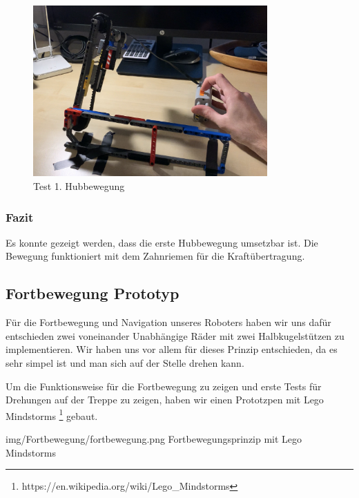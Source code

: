 \begin{figure}[H]
  \includegraphics[width=0.8\textwidth]{img/Test 1. Hub.png}
  \centering
  \caption{Test 1. Hubbewegung}
\end{figure}

\subsubsection{Fazit}

Es konnte gezeigt werden, dass die erste Hubbewegung umsetzbar ist. Die Bewegung funktioniert mit dem Zahnriemen für die Kraftübertragung.

\subsection{Fortbewegung Prototyp}

Für die Fortbewegung und Navigation unseres Roboters haben wir uns dafür entschieden zwei
voneinander Unabhängige Räder mit zwei Halbkugelstützen zu implementieren. 
Wir haben uns vor allem für dieses Prinzip entschieden, da es sehr simpel ist und man 
sich auf der Stelle drehen kann. 

Um die Funktionsweise für die Fortbewegung zu zeigen und erste Tests für Drehungen auf
der Treppe zu zeigen, haben wir einen Prototzpen mit Lego Mindstorms \footnote{https://en.wikipedia.org/wiki/Lego_Mindstorms}
gebaut.

\image
  {img/Fortbewegung/fortbewegung.png}
  {Fortbewegungsprinzip mit Lego Mindstorms}




